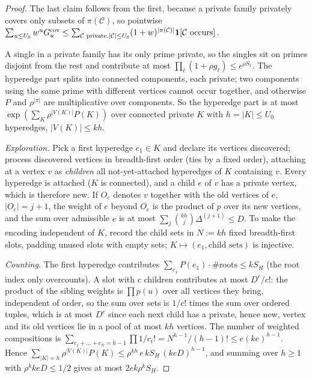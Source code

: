 \documentclass[11pt,reqno]{amsart}
\theoremstyle{definition}
\begin{document}
\begin{proof}
The last claim follows from the first, because a private family privately
covers only subsets of $\pi(\mathcal C)$, so pointwise
$\sum_{u\le U_0}w^uG^{\rm cov}_u\le\sum_{\mathcal C\text{ private},|\mathcal C|\le U_0}(1+w)^{|\pi(\mathcal C)|}\mathbf 1[\mathcal C\text{ occurs}]$.

A single in a private family has its only prime private, so the singles sit
on primes disjoint from the rest and contribute at most
$\prod_\ell(1+\rho g_\ell)\le e^{\rho S_1}$.  The hyperedge part splits into
connected components, each private; two components using the same prime with
different vertices cannot occur together, and otherwise $P$ and
$\rho^{|\pi|}$ are multiplicative over components.  So the hyperedge part is
at most $\exp(\sum_K\rho^{|V(K)|}P(K))$ over connected private $K$ with
$h=|K|\le U_0$ hyperedges, $|V(K)|\le kh$.

\emph{Exploration.}  Pick a first hyperedge $e_1\in K$ and declare its
vertices discovered; process discovered vertices in breadth-first order (ties
by a fixed order), attaching at a vertex $v$ as \emph{children} all
not-yet-attached hyperedges of $K$ containing $v$.  Every hyperedge is attached
($K$ is connected), and a child $e$ of $v$ has a private vertex, which is
therefore new.  If $O_e$ denotes $v$ together with the old vertices of $e$,
$|O_e|=j+1$, the weight of $e$ beyond $O_e$ is the product of $p$ over its new
vertices, and the sum over admissible $e$ is at most
$\sum_j\binom{kh}j\Delta^{(j+1)}\le D$.  To make the encoding independent of
$K$, record the child sets in $N:=kh$ fixed breadth-first slots, padding
unused slots with empty sets; $K\mapsto(e_1,\text{child sets})$ is injective.

\emph{Counting.}  The first hyperedge contributes
$\sum_{e_1}P(e_1)\cdot\#\text{roots}\le kS_H$ (the root index only
overcounts).  A slot with $c$ children contributes at most $D^c/c!$: the
product of the sibling weights is $\prod p(u)$ over all vertices they bring,
independent of order, so the sum over sets is $1/c!$ times the sum over
ordered tuples, which is at most $D^c$ since each next child has a private,
hence new, vertex and its old vertices lie in a pool of at most $kh$
vertices.  The number of weighted compositions is
$\sum_{c_1+\dots+c_N=h-1}\prod1/c_i!=N^{h-1}/(h-1)!\le e(ke)^{h-1}$.  Hence
$\sum_{|K|=h}\rho^{|V(K)|}P(K)\le\rho^{kh}\,e\,kS_H\,(keD)^{h-1}$, and summing
over $h\ge1$ with $\rho^kkeD\le1/2$ gives at most $2ek\rho^kS_H$.
\end{proof}
\end{document}
